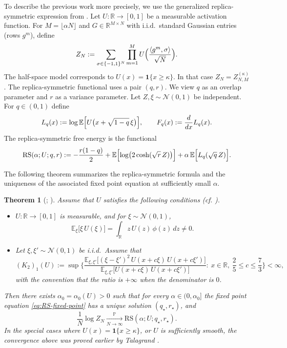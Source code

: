 \documentclass[11pt]{article}
\newtheorem{theorem}{Theorem}
\begin{document}
To describe the previous work more precisely, we use the generalized replica-symmetric expression from \cite{BolthausenNakajimaSunXu2022}.
Let $U:\mathbb R\to[0,1]$ be a measurable activation function.
For $M=\lfloor \alpha N\rfloor$ and $G\in\mathbb R^{M\times N}$ with i.i.d.\ standard Gaussian entries (rows $g^m$), define
\[
Z_N
:=
\sum_{\sigma\in\{-1,1\}^N}
\prod_{m=1}^M U\Bigl(\frac{\langle g^m,\sigma\rangle}{\sqrt N}\Bigr).
\]
The half-space model corresponds to $U(x)=\mathbf 1\{x\ge \kappa\}$. In that case $Z_N=Z_{N,M}^{(\kappa)}$.
The replica-symmetric functional uses a pair $(q,r)$. We view $q$ as an overlap parameter and $r$ as a variance parameter.
Let $Z,\xi\sim\mathcal N(0,1)$ be independent.
For $q\in(0,1)$ define
\[
L_q(x):=\log\mathbb E\Bigl[U\bigl(x+\sqrt{1-q}\,\xi\bigr)\Bigr],
\qquad
F_q(x):=\frac{d}{dx}L_q(x).
\]
The replica-symmetric free energy is the functional
\begin{equation}\label{eq:RS-functional}
\mathrm{RS}(\alpha;U;q,r)
:=
-\frac{r(1-q)}{2}
+
\mathbb E\Bigl[\log\bigl(2\cosh(\sqrt r\,Z)\bigr)\Bigr]
+
\alpha\,\mathbb E\Bigl[L_q(\sqrt q\,Z)\Bigr].
\end{equation}


The following theorem summarizes the replica-symmetric formula and the uniqueness of the associated fixed point equation at sufficiently small $\alpha$.

\begin{theorem}[\cite{Talagrand2000}; \cite{BolthausenNakajimaSunXu2022}]
Assume that $U$ satisfies the following conditions (cf. \cite{BolthausenNakajimaSunXu2022}).
\begin{itemize}
\item[\textup{(A1)}] $U:\mathbb R\to[0,1]$ is measurable, and for $\xi\sim\mathcal N(0,1)$,
\[
\mathbb E_{\xi}\bigl[\xi\,U(\xi)\bigr]
=
\int_{\mathbb R} z\,U(z)\,\phi(z)\,dz
\neq 0.
\]
\item[\textup{(A2)}] Let $\xi,\xi'\sim\mathcal N(0,1)$ be i.i.d.\ Assume that
\[
(K_2)_1(U)
:=
\sup\Biggl\{
\frac{\mathbb E_{\xi,\xi'}\bigl[(\xi-\xi')^2\,U(x+c\xi)\,U(x+c\xi')\bigr]}
 {\mathbb E_{\xi,\xi'}\bigl[U(x+c\xi)\,U(x+c\xi')\bigr]}
:\ x\in\mathbb R,\ \frac{2}{5}\le c\le \frac{7}{3}
\Biggr\}<\infty,
\]
with the convention that the ratio is $+\infty$ when the denominator is $0$. 
\end{itemize}

Then there exists $\alpha_0=\alpha_0(U)>0$ such that for every $\alpha\in(0,\alpha_0]$ the fixed point equation \eqref{eq:RS-fixed-point} has a unique solution $(q_\star,r_\star)$, and
\[
\frac{1}{N}\log Z_N \xrightarrow[N\to\infty]{\mathbb P} \mathrm{RS}(\alpha;U;q_\star,r_\star).
\]
In the special cases where $U(x)=\mathbf 1\{x\ge \kappa\}$, or $U$ is sufficiently smooth, the convergence above was proved earlier by Talagrand \cite{Talagrand2000,Talagrand2011}.
\end{theorem}
\end{document}
